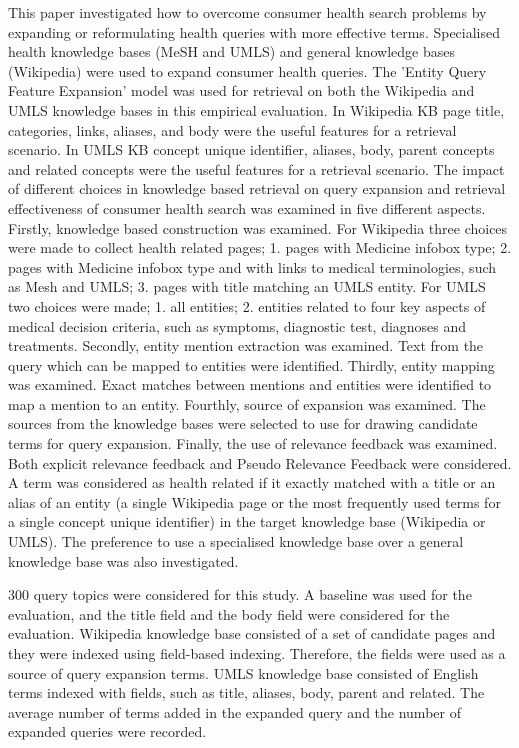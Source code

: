 \documentclass[]{article}
\begin{document}
This paper investigated how to overcome consumer health search problems by expanding or reformulating health queries with more effective terms. Specialised health knowledge bases (MeSH and UMLS) and general knowledge bases (Wikipedia) were used to expand consumer health queries. The 'Entity Query Feature Expansion' model was used for retrieval on both the Wikipedia and UMLS knowledge bases in this empirical evaluation. In Wikipedia KB page title, categories, links, aliases, and body were the useful features for a retrieval scenario. In UMLS KB concept unique identifier, aliases, body, parent concepts and related concepts were the useful features for a retrieval scenario. The impact of different choices in knowledge based retrieval on query expansion and retrieval effectiveness of consumer health search was examined in five different aspects. Firstly, knowledge based construction was examined. For Wikipedia three choices were made to collect health related pages; 1. pages with Medicine infobox type; 2. pages with Medicine infobox type and with links to medical terminologies, such as Mesh and UMLS; 3. pages with title matching an UMLS entity. For UMLS two choices were made; 1. all entities; 2. entities related to four key aspects of medical decision criteria, such as symptoms, diagnostic test, diagnoses and treatments.  Secondly, entity mention extraction was examined. Text from the query which can be mapped to entities were identified. Thirdly, entity mapping was examined. Exact matches between mentions and entities were identified to map a mention to an entity. Fourthly, source of expansion was examined. The sources from the knowledge bases were selected to use for drawing candidate terms for query expansion. Finally, the use of relevance feedback was examined. Both explicit relevance feedback and Pseudo Relevance Feedback were considered. A term was considered as health related if it exactly matched with a title or an alias of an entity (a single Wikipedia page or the most frequently used terms for a single concept unique identifier) in the target knowledge base (Wikipedia or UMLS). The preference to use a specialised knowledge base over a general knowledge base was also investigated. 

300 query topics were considered for this study. A baseline was used for the evaluation, and the title field and the body field were considered for the evaluation. Wikipedia knowledge base consisted of a set of candidate pages and they were indexed using field-based indexing. Therefore, the fields were used as a source of query expansion terms. UMLS knowledge base consisted of English terms indexed with fields, such as title, aliases, body, parent and related. The average number of terms added in the expanded query and the number of expanded queries were recorded.
\end{document}

